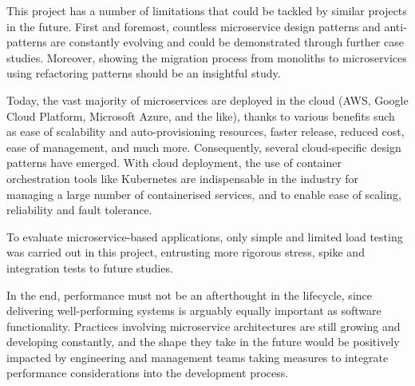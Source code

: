 This project has a number of limitations that could be tackled by similar projects in the future. First and foremost, countless microservice design patterns and anti-patterns are constantly evolving and could be demonstrated through further case studies. Moreover, showing the migration process from monoliths to microservices using refactoring patterns should be an insightful study.

Today, the vast majority of microservices are deployed in the cloud (AWS, Google Cloud Platform, Microsoft Azure, and the like), thanks to various benefits such as ease of scalability and auto-provisioning resources, faster release, reduced cost, ease of management, and much more. Consequently, several cloud-specific design patterns have emerged. With cloud deployment, the use of container orchestration tools like Kubernetes are indispensable in the industry for managing a large number of containerised services, and to enable ease of scaling, reliability and fault tolerance.

To evaluate microservice-based applications, only simple and limited load testing was carried out in this project, entrusting more rigorous stress, spike and integration tests to future studies.

In the end, performance must not be an afterthought in the lifecycle, since delivering well-performing systems is arguably equally important as software functionality. Practices involving microservice architectures are still growing and developing constantly, and the shape they take in the future would be positively impacted by engineering and management teams taking measures to integrate performance considerations into the development process.
